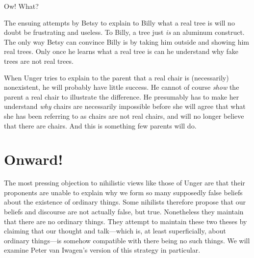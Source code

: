 \documentclass[11pt]{standalone} \newif\ifstandlone \standalonetrue
\newcommand{\stage}[3]%
{%
	\begin{spacing}{1}%
	\vspace{0pt}
		\begin{description}[style=nextline, parsep=0pt,
                    leftmargin=15mm, itemindent=-10mm, font=\mdseries]
			\item[\textsc{#1} \emph{#2}] #3
		\end{description}%
	\end{spacing}%
}
\begin{document}
\begin{spacing}{1.5}
\stage{Billy}{}{Ow!  What?}

The ensuing attempts by Betsy to explain to Billy what a real tree is
will no doubt be frustrating and useless.  To Billy, a tree just {\em
  is} an aluminum construct.  The only way Betsy can convince Billy is
by taking him outside and showing him real trees.  Only once he learns
what a real tree is can he understand why fake trees are not real
trees.

When Unger tries to explain to the parent that a real chair is
(necessarily) nonexistent, he will probably have little success.  He
cannot of course {\em show} the parent a real chair to illustrate the
difference.  He presumably has to make her understand {\em why} chairs
are necessarily impossible before she will agree that what she has
been referring to as chairs are not real chairs, and will no longer
believe that there are chairs.  And this is something few parents will
do.

\section{Onward!}
The most pressing objection to nihilistic views like those of Unger
are that their proponents are unable to explain why we form so many
supposedly false beliefs about the existence of ordinary things.  Some
nihilists therefore propose that our beliefs and discourse are not
actually false, but true.  Nonetheless they maintain that there are no
ordinary things.  They attempt to maintain these two theses by
claiming that our thought and talk---which is, at least superficially,
about ordinary things---is somehow compatible with there being no such
things.  We will examine Peter van Iwagen's version of this strategy
in particular.

\ifstandalone


\end{spacing}
\fi
\end{document}

